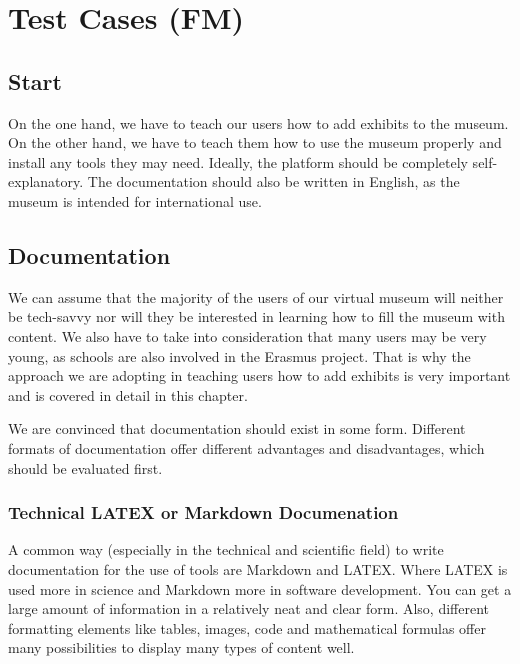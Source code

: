 \chapter{Test Cases (FM)}
\label{cha:Test Cases}

\section{Start}

On the one hand, we have to teach our users how to add exhibits to the museum. On the other hand, we have to teach them how to use the museum properly and install any tools they may need. Ideally, the platform should be completely self-explanatory. The documentation should also be written in English, as the museum is intended for international use.

\section{Documentation}

We can assume that the majority of the users of our virtual museum will neither be tech-savvy nor will they be interested in learning how to fill the museum with content. We also have to take into consideration that many users may be very young, as schools are also involved in the Erasmus project. That is why the approach we are adopting in teaching users how to add exhibits is very important and is covered in detail in this chapter.

We are convinced that documentation should exist in some form. Different formats of documentation offer different advantages and disadvantages, which should be evaluated first.

\subsection{Technical LATEX or Markdown  Documenation}

A common way (especially in the technical and scientific field) to write documentation for the use of tools are Markdown and LATEX. Where LATEX is used more in science and Markdown more in software development. You can get a large amount of information in a relatively neat and clear form. Also, different formatting elements like tables, images, code and mathematical formulas offer many possibilities to display many types of content well. 

\vspace{0.5cm}

